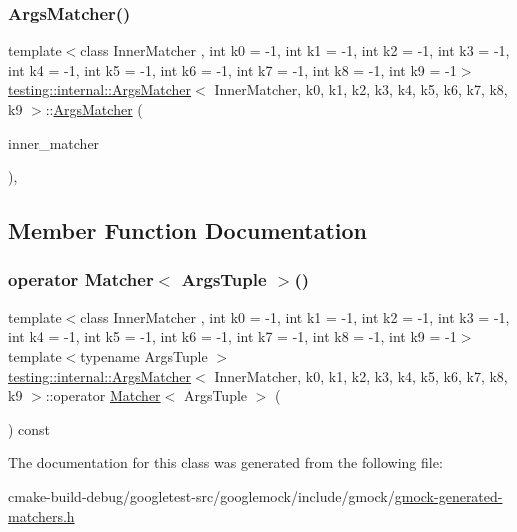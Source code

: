 \subsubsection{\texorpdfstring{ArgsMatcher()}{ArgsMatcher()}}
{\footnotesize\ttfamily template$<$class Inner\+Matcher , int k0 = -\/1, int k1 = -\/1, int k2 = -\/1, int k3 = -\/1, int k4 = -\/1, int k5 = -\/1, int k6 = -\/1, int k7 = -\/1, int k8 = -\/1, int k9 = -\/1$>$ \\
\mbox{\hyperlink{classtesting_1_1internal_1_1ArgsMatcher}{testing\+::internal\+::\+Args\+Matcher}}$<$ Inner\+Matcher, k0, k1, k2, k3, k4, k5, k6, k7, k8, k9 $>$\+::\mbox{\hyperlink{classtesting_1_1internal_1_1ArgsMatcher}{Args\+Matcher}} (\begin{DoxyParamCaption}\item[{const Inner\+Matcher \&}]{inner\+\_\+matcher }\end{DoxyParamCaption})\hspace{0.3cm}{\ttfamily [inline]}, {\ttfamily [explicit]}}



\subsection{Member Function Documentation}
\mbox{\label{classtesting_1_1internal_1_1ArgsMatcher_ad55698b0de384a9d8875cef5b172cb4a}} 
\subsubsection{\texorpdfstring{operator Matcher$<$ ArgsTuple $>$()}{operator Matcher< ArgsTuple >()}}
{\footnotesize\ttfamily template$<$class Inner\+Matcher , int k0 = -\/1, int k1 = -\/1, int k2 = -\/1, int k3 = -\/1, int k4 = -\/1, int k5 = -\/1, int k6 = -\/1, int k7 = -\/1, int k8 = -\/1, int k9 = -\/1$>$ \\
template$<$typename Args\+Tuple $>$ \\
\mbox{\hyperlink{classtesting_1_1internal_1_1ArgsMatcher}{testing\+::internal\+::\+Args\+Matcher}}$<$ Inner\+Matcher, k0, k1, k2, k3, k4, k5, k6, k7, k8, k9 $>$\+::operator \mbox{\hyperlink{classtesting_1_1Matcher}{Matcher}}$<$ Args\+Tuple $>$ (\begin{DoxyParamCaption}{ }\end{DoxyParamCaption}) const\hspace{0.3cm}{\ttfamily [inline]}}



The documentation for this class was generated from the following file\+:\begin{DoxyCompactItemize}
\item 
cmake-\/build-\/debug/googletest-\/src/googlemock/include/gmock/\mbox{\hyperlink{gmock-generated-matchers_8h}{gmock-\/generated-\/matchers.\+h}}\end{DoxyCompactItemize}
